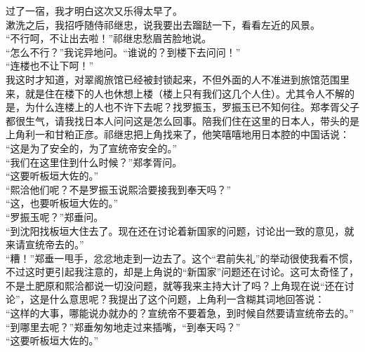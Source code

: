 过了一宿，我才明白这次又乐得太早了。\\

漱洗之后，我招呼随侍祁继忠，说我要出去蹓跶一下，看看左近的风景。\\

“不行呵，不让出去啦！”祁继忠愁眉苦脸地说。\\

“怎么不行？”我诧异地问。“谁说的？到楼下去问问！”\\

“连楼也不让下呵！”\\

我这时才知道，对翠阁旅馆已经被封锁起来，不但外面的人不准进到旅馆范围里来，就是住在楼下的人也休想上楼（楼上只有我们这几个人住）。尤其令人不解的是，为什么连楼上的人也不许下去呢？找罗振玉，罗振玉已不知何往。郑孝胥父子都很生气，请我找日本人问问这是怎么回事。陪我们住在这里的日本人，带头的是上角利一和甘粕正彦。祁继忠把上角找来了，他笑嘻嘻地用日本腔的中国话说：\\

“这是为了安全的，为了宣统帝安全的。”\\

“我们在这里住到什么时候？”郑孝胥问。\\

“这要听板垣大佐的。”\\

“熙洽他们呢？不是罗振玉说熙洽要接我到奉天吗？”\\

“这，也要听板垣大佐的。”\\

“罗振玉呢？”郑垂问。\\

“到沈阳找板垣大住去了。现在还在讨论着新国家的问题，讨论出一致的意见，就来请宣统帝去的。”\\

“糟！”郑垂一甩手，忿忿地走到一边去了。这个“君前失礼”的举动很使我看不惯，不过这时更引起我注意的，却是上角说的“新国家”问题还在讨论。这可太奇怪了，不是土肥原和熙洽都说一切没问题，就等我来主持大计了吗？上角现在说“还在讨论”，这是什么意思呢？我提出了这个问题，上角利一含糊其词地回答说：\\

“这样的大事，哪能说办就办的？宣统帝不要着急，到时候自然要请宣统帝去的。”\\

“到哪里去呢？”郑垂匆匆地走过来插嘴，“到奉天吗？”\\

“这要听板垣大佐的。”\\

